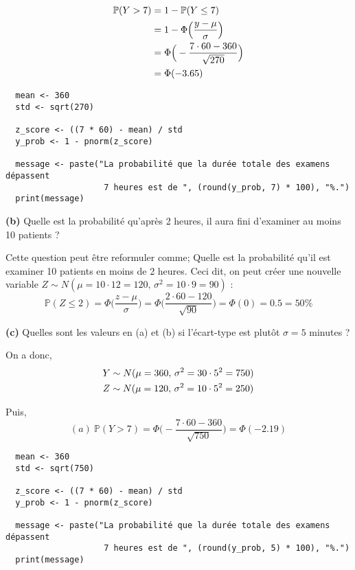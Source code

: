 \documentclass[10pt,a4paper]{article}
\begin{document}
	\vspace{-.5cm}
	\begin{align}
		\mathbb{P}(Y > 7) &= 1 - \mathbb{P}(Y \le 7) \notag \\
		&= 1 - \Phi\Big(\frac{y - \mu}{\sigma}\Big) \notag \\
		&= \Phi\Big(-\frac{7 \cdot 60 - 360}{\sqrt{270}}\Big) \notag \\
		&= \Phi(-3.65) \notag
	\end{align}

	\begin{verbatim}
  mean <- 360
  std <- sqrt(270)	

  z_score <- ((7 * 60) - mean) / std
  y_prob <- 1 - pnorm(z_score)
		
  message <- paste("La probabilité que la durée totale des examens dépassent 
                    7 heures est de ", (round(y_prob, 7) * 100), "%.")
  print(message)
	\end{verbatim}
	  

	\textbf{(b)} Quelle est la probabilité qu'après 2 heures, il aura fini d'examiner au moins 10 patients ?

	\vspace{.2cm}
	Cette question peut être reformuler comme; Quelle est la probabilité qu'il est examiner 10 patients en moins de 2 heures. Ceci dit, on peut créer une nouvelle variable \(Z \sim N(\mu = 10 \cdot 12 = 120,\, \sigma^2 = 10 \cdot 9 = 90)\) :
	$$
	\mathbb{P}(Z \le 2) = \Phi\Big(\frac{z - \mu}{\sigma}\Big) = \Phi\Big(\frac{2 \cdot 60 - 120}{\sqrt{90}}\Big) = \Phi(0) = 0.5 = 50\%
	$$

	\textbf{(c)} Quelles sont les valeurs en (a) et (b) si l'écart-type est plutôt $\sigma = 5$ minutes ?
	
	\vspace{.2cm}
	On a donc,
	\begin{gather}
		Y \sim N(\mu = 360,\, \sigma^2 = 30 \cdot 5^2 = 750) \notag \\
		Z \sim N(\mu = 120,\, \sigma^2 = 10 \cdot 5^2 = 250) \notag
	\end{gather}

	Puis,
		\[(a)\ \mathbb{P}(Y > 7) = \Phi\Big(-\frac{7 \cdot 60 - 360}{\sqrt{750}}\Big) = \Phi(-2.19) \]
	
	\begin{verbatim}
  mean <- 360
  std <- sqrt(750)	
		  
  z_score <- ((7 * 60) - mean) / std
  y_prob <- 1 - pnorm(z_score)
				  
  message <- paste("La probabilité que la durée totale des examens dépassent 
                    7 heures est de ", (round(y_prob, 5) * 100), "%.")
  print(message)
	\end{verbatim}
		
\end{document}
